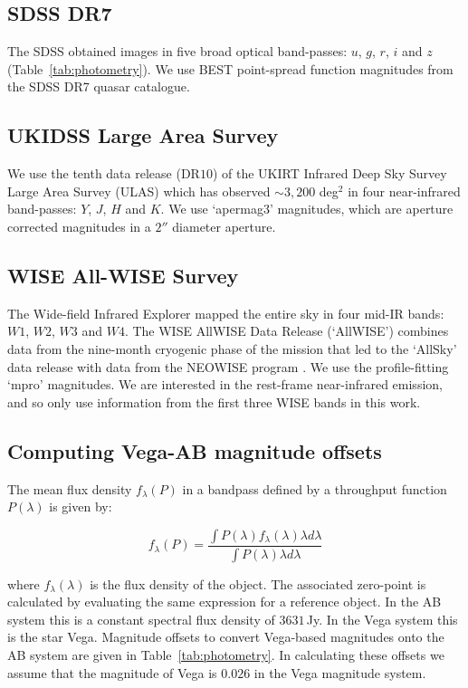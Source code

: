 \subsection{SDSS DR7}

The SDSS obtained images in five broad optical band-passes: $u$, $g$, $r$, $i$ and $z$ (Table~\ref{tab:photometry}).  
We use BEST point-spread function magnitudes from the SDSS DR7 quasar catalogue.

\subsection{UKIDSS Large Area Survey}

We use the tenth data release (DR$10$) of the UKIRT Infrared Deep Sky Survey \citep[UKIDSS;][]{lawrence07} Large Area Survey (ULAS) which has observed $\sim 3,200$ deg$^2$ in four near-infrared band-passes: $Y$, $J$, $H$ and $K$. 
We use `apermag3' magnitudes, which are aperture corrected magnitudes in a $2''$ diameter aperture.

\subsection{WISE All-WISE Survey}

The Wide-field Infrared Explorer \citep[WISE;][]{wright10} mapped the entire sky in four mid-IR bands: $W1$, $W2$, $W3$ and $W4$. 
The WISE AllWISE Data Release (`AllWISE') combines data from the nine-month cryogenic phase of the mission that led to the `AllSky' data release with data from the NEOWISE program \citep{mainzer11}. 
We use the profile-fitting `mpro' magnitudes.   
We are interested in the rest-frame near-infrared emission, and so only use information from the first three WISE bands in this work.

\subsection{Computing Vega-AB magnitude offsets}

The mean flux density $f_\lambda(P)$ in a bandpass defined by a throughput function $P(\lambda)$ is given by: 

\begin{equation}
  f_\lambda(P) = \frac {\int P(\lambda)f_\lambda(\lambda)\lambda d\lambda} {\int P(\lambda)\lambda d\lambda} 
\end{equation}

where $f_\lambda(\lambda)$ is the flux density of the object. 
The associated zero-point is calculated by evaluating the same expression for a reference object. 
In the AB system \citep{oke83} this is a constant spectral flux density of $3631$\,Jy.
In the Vega system this is the star Vega. 
Magnitude offsets to convert Vega-based magnitudes onto the AB system are given in Table~\ref{tab:photometry}. 
In calculating these offsets we assume that the magnitude of Vega is $0.026$ in the Vega magnitude system. 

